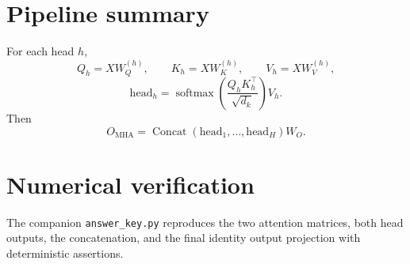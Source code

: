 \documentclass[11pt]{article}
\newcommand{\softmax}{\operatorname{softmax}}
\newcommand{\Concat}{\operatorname{Concat}}
\begin{document}
\section*{Pipeline summary}

For each head $h$,
\[
Q_h=XW_Q^{(h)},\qquad
K_h=XW_K^{(h)},\qquad
V_h=XW_V^{(h)},
\]
\[
\mathrm{head}_h
=
\softmax\left(\frac{Q_hK_h^\top}{\sqrt{d_k}}\right)V_h.
\]
Then
\[
\boxed{
O_{\mathrm{MHA}}
=
\Concat(\mathrm{head}_1,\ldots,\mathrm{head}_H)W_O
}.
\]

\section*{Numerical verification}

The companion \texttt{answer\_key.py} reproduces the two attention matrices, both head outputs, the concatenation, and the final identity output projection with deterministic assertions.
\end{document}
